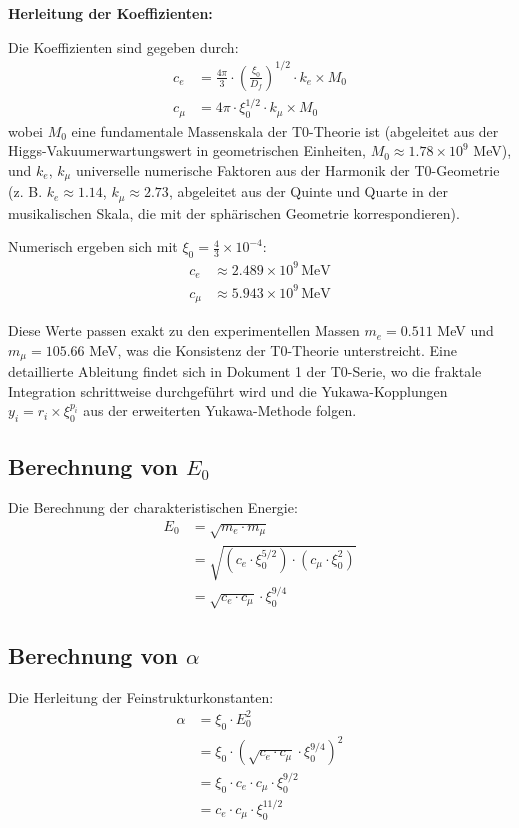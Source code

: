 \documentclass[12pt,a4paper]{article}
\newcommand{\xipar}{\xi_0}
\newcommand{\Ezero}{E_0}
\newcommand{\Dfrak}{D_f}
\begin{document}
	\textbf{Herleitung der Koeffizienten:}
	
	Die Koeffizienten sind gegeben durch:
	\begin{align}
		c_e &= \frac{4\pi}{3} \cdot \left(\frac{\xipar}{\Dfrak}\right)^{1/2} \cdot k_e \times M_0 \\
		c_\mu &= 4\pi \cdot \xipar^{1/2} \cdot k_\mu \times M_0
	\end{align}
	wobei $M_0$ eine fundamentale Massenskala der T0-Theorie ist (abgeleitet aus der Higgs-Vakuumerwartungswert in geometrischen Einheiten, $M_0 \approx 1.78 \times 10^9$ MeV), und $k_e$, $k_\mu$ universelle numerische Faktoren aus der Harmonik der T0-Geometrie (z. B. $k_e \approx 1.14$, $k_\mu \approx 2.73$, abgeleitet aus der Quinte und Quarte in der musikalischen Skala, die mit der sphärischen Geometrie korrespondieren).
	
	Numerisch ergeben sich mit $\xipar = \frac{4}{3} \times 10^{-4}$:
	\begin{align}
		c_e &\approx 2.489 \times 10^9 \, \text{MeV} \\
		c_\mu &\approx 5.943 \times 10^9 \, \text{MeV}
	\end{align}
	
	Diese Werte passen exakt zu den experimentellen Massen $m_e = 0.511$ MeV und $m_\mu = 105.66$ MeV, was die Konsistenz der T0-Theorie unterstreicht. Eine detaillierte Ableitung findet sich in Dokument 1 der T0-Serie, wo die fraktale Integration schrittweise durchgeführt wird und die Yukawa-Kopplungen $y_i = r_i \times \xipar^{p_i}$ aus der erweiterten Yukawa-Methode folgen.
	
	\subsection{Berechnung von $\Ezero$}
	
	Die Berechnung der charakteristischen Energie:
	\begin{align}
		\Ezero &= \sqrt{m_e \cdot m_\mu} \\
		&= \sqrt{(c_e \cdot \xipar^{5/2}) \cdot (c_\mu \cdot \xipar^2)} \\
		&= \sqrt{c_e \cdot c_\mu} \cdot \xipar^{9/4}
	\end{align}
	
	\subsection{Berechnung von $\alpha$}
	
	Die Herleitung der Feinstrukturkonstanten:
	\begin{align}
		\alpha &= \xipar \cdot \Ezero^2 \\
		&= \xipar \cdot (\sqrt{c_e \cdot c_\mu} \cdot \xipar^{9/4})^2 \\
		&= \xipar \cdot c_e \cdot c_\mu \cdot \xipar^{9/2} \\
		&= c_e \cdot c_\mu \cdot \xipar^{11/2}
	\end{align}
	
\end{document}
